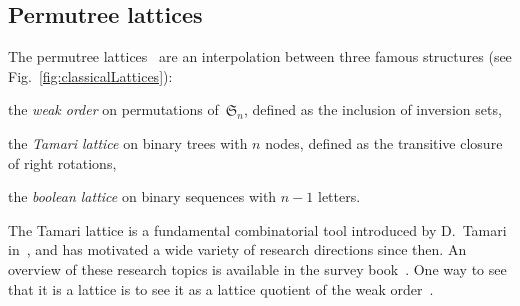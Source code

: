 \documentclass[a4paper,12pt]{article}
\newcommand{\fS}{\mathfrak{S}} %
\newcommand{\defn}[1]{\emph{\color{blue} #1}} %
\begin{document}
\subsection{Permutree lattices}

The permutree lattices~\cite{PilaudPons-permutrees} are an interpolation between three famous structures (see Fig.~\ref{fig:classicalLattices}):

\begin{compactitem}
\item the \defn{weak order} on permutations of~$\fS_n$, defined as the inclusion of inversion sets,
\item the \defn{Tamari lattice} on binary trees with $n$ nodes, defined as the transitive closure of right rotations,
\item the \defn{boolean lattice} on binary sequences with $n-1$ letters.
\end{compactitem}
The Tamari lattice is a fundamental combinatorial tool introduced by D.~Tamari in~\cite{Tamari}, and has motivated a wide variety of research directions since then.
An overview of these research topics is available in the survey book~\cite{TamariFestschrift}.
One way to see that it is a lattice is to see it as a lattice quotient of the weak order~\cite{Reading-cambrianLattices, ChatelPilaud}.
\end{document}
